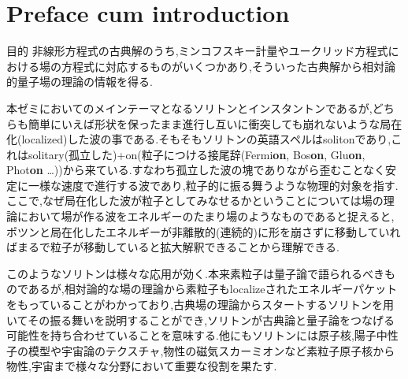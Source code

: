 \documentclass[dvipdfmx,11pt,a4paper,oneside,openany]{jsbook}
\begin{document}


\newcommand{\ctext}[1]{\raise0.2ex\hbox{\textcircled{\scriptsize{#1}}}}

\addtolength{\fullwidth}{-26truemm} %
\setlength{\textwidth}{\fullwidth}  %
\setlength{\evensidemargin}{10truemm}   %
\setlength{\oddsidemargin}{10truemm}    %
\chapter{Preface cum introduction}
\begin{itembox}[l]{目的}
    非線形方程式の古典解のうち,ミンコフスキー計量やユークリッド方程式における場の方程式に対応するものがいくつかあり,そういった古典解から相対論的量子場の理論の情報を得る.
\end{itembox}
本ゼミにおいてのメインテーマとなるソリトンとインスタントンであるが,どちらも簡単にいえば形状を保ったまま進行し互いに衝突しても崩れないような局在化(localized)した波の事である.そもそもソリトンの英語スペルはsolitonであり,これはsolitary(孤立した)+on(粒子につける接尾辞(Fermi{\bf on}, Bos{\bf on}, Glu{\bf on}, Phot{\bf on} \dots))から来ている.すなわち孤立した波の塊でありながら歪むことなく安定に一様な速度で進行する波であり,粒子的に振る舞うような物理的対象を指す.ここで,なぜ局在化した波が粒子としてみなせるかということについては場の理論において場が作る波をエネルギーのたまり場のようなものであると捉えると,ポツンと局在化したエネルギーが非離散的(連続的)に形を崩さずに移動していればまるで粒子が移動していると拡大解釈できることから理解できる.

このようなソリトンは様々な応用が効く.本来素粒子は量子論で語られるべきものであるが,相対論的な場の理論から素粒子もlocalizeされたエネルギーパケットをもっていることがわかっており,古典場の理論からスタートするソリトンを用いてその振る舞いを説明することができ,ソリトンが古典論と量子論をつなげる可能性を持ち合わせていることを意味する.他にもソリトンには原子核,陽子中性子の模型や宇宙論のテクスチャ,物性の磁気スカーミオンなど素粒子原子核から物性,宇宙まで様々な分野において重要な役割を果たす.
\end{document}
